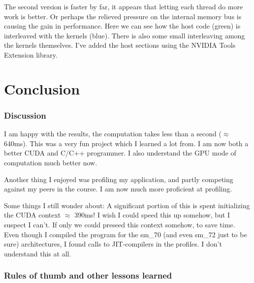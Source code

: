 \documentclass[a4paper,titlepage,12pt]{article}
\begin{document}
\begin{description}[left = \parindent]
The second version is faster by far, it appears that letting each thread do more work is better.
Or perhaps the relieved pressure on the internal memory bus is causing the gain in performance.
Here we can see how the host code (green) is interleaved with the kernels (blue).
There is also some small interleaving among the kernels themselves.
I've added the host sections using the NVIDIA Tools Extension library.

\part{Conclusion}

\section{Discussion}

I am happy with the results, the computation takes less than a second (\(\approx\) 640ms).
This was a very fun project which I learned a lot from.
I am now both a better CUDA and C/C++ programmer.
I also understand the GPU mode of computation much better now.

Another thing I enjoyed was profiling my application, and partly competing against my peers in the course.
I am now much more proficient at profiling.

Some things I still wonder about:
A significant portion of this is spent initializing the CUDA context \(\approx\) 390ms!
I wish I could speed this up somehow, but I suspect I can't.
If only we could preseed this context somehow, to save time.
Even though I compiled the program for the sm\_70 (and even sm\_72 just to be sure) architectures, I found calls to JIT-compilers in the profiles.
I don't understand this at all.


\section{Rules of thumb and other lessons learned}


\end{description}
\end{document}
